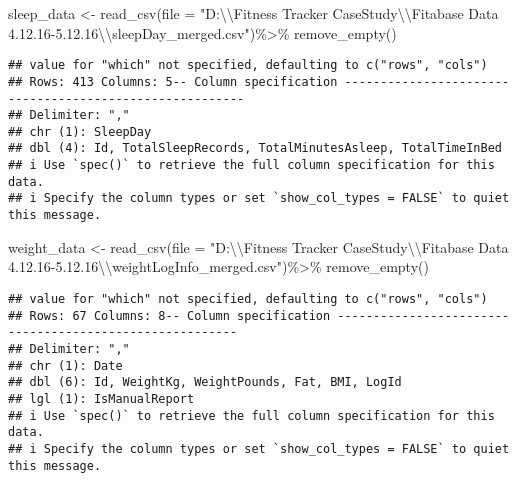 \documentclass[
]{article}
\newenvironment{Shaded}{\begin{snugshade}}{\end{snugshade}}
\newcommand{\AttributeTok}[1]{\textcolor[rgb]{0.77,0.63,0.00}{#1}}
\newcommand{\FunctionTok}[1]{\textcolor[rgb]{0.00,0.00,0.00}{#1}}
\newcommand{\NormalTok}[1]{#1}
\newcommand{\OtherTok}[1]{\textcolor[rgb]{0.56,0.35,0.01}{#1}}
\newcommand{\SpecialCharTok}[1]{\textcolor[rgb]{0.00,0.00,0.00}{#1}}
\newcommand{\StringTok}[1]{\textcolor[rgb]{0.31,0.60,0.02}{#1}}
\begin{document}
\begin{Shaded}
\begin{Highlighting}[]
\NormalTok{ sleep\_data }\OtherTok{\textless{}{-}} \FunctionTok{read\_csv}\NormalTok{(}\AttributeTok{file =} \StringTok{"D:}\SpecialCharTok{\textbackslash{}\textbackslash{}}\StringTok{Fitness Tracker CaseStudy}\SpecialCharTok{\textbackslash{}\textbackslash{}}\StringTok{Fitabase Data 4.12.16{-}5.12.16}\SpecialCharTok{\textbackslash{}\textbackslash{}}\StringTok{sleepDay\_merged.csv"}\NormalTok{)}\SpecialCharTok{\%\textgreater{}\%}
 \FunctionTok{remove\_empty}\NormalTok{()}
\end{Highlighting}
\end{Shaded}

\begin{verbatim}
## value for "which" not specified, defaulting to c("rows", "cols")
## Rows: 413 Columns: 5-- Column specification --------------------------------------------------------
## Delimiter: ","
## chr (1): SleepDay
## dbl (4): Id, TotalSleepRecords, TotalMinutesAsleep, TotalTimeInBed
## i Use `spec()` to retrieve the full column specification for this data.
## i Specify the column types or set `show_col_types = FALSE` to quiet this message.
\end{verbatim}

\begin{Shaded}
\begin{Highlighting}[]
\NormalTok{  weight\_data }\OtherTok{\textless{}{-}} \FunctionTok{read\_csv}\NormalTok{(}\AttributeTok{file =} \StringTok{"D:}\SpecialCharTok{\textbackslash{}\textbackslash{}}\StringTok{Fitness Tracker CaseStudy}\SpecialCharTok{\textbackslash{}\textbackslash{}}\StringTok{Fitabase Data 4.12.16{-}5.12.16}\SpecialCharTok{\textbackslash{}\textbackslash{}}\StringTok{weightLogInfo\_merged.csv"}\NormalTok{)}\SpecialCharTok{\%\textgreater{}\%}
 \FunctionTok{remove\_empty}\NormalTok{()}
\end{Highlighting}
\end{Shaded}

\begin{verbatim}
## value for "which" not specified, defaulting to c("rows", "cols")
## Rows: 67 Columns: 8-- Column specification --------------------------------------------------------
## Delimiter: ","
## chr (1): Date
## dbl (6): Id, WeightKg, WeightPounds, Fat, BMI, LogId
## lgl (1): IsManualReport
## i Use `spec()` to retrieve the full column specification for this data.
## i Specify the column types or set `show_col_types = FALSE` to quiet this message.
\end{verbatim}
\end{document}
